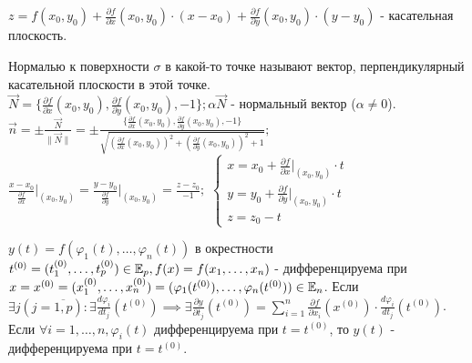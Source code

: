 \documentclass[../main.tex]{subfiles}
\begin{document}
$z = f(x_{0},y_{0}) + \frac{\partial{f}}{\partial{x}}(x_{0},y_{0})\cdot(x-x_{0})+ \frac{\partial{f}}{\partial{y}}(x_{0},y_{0})\cdot(y-y_{0})$ - касательная плоскость. 

Нормалью к поверхности $\sigma$ в какой-то точке называют вектор, перпендикулярный касательной плоскости в этой точке.\\
$\vec{N} = \{ \frac{\partial{f}}{\partial{x}}(x_{0},y_{0}), \frac{\partial{f}}{\partial{y}}(x_{0},y_{0}), -1\} ; \alpha \vec{N}$ - нормальный вектор ($\alpha \neq 0$). 
\\ $\vec{n} = \pm  \frac{\vec{N}}{\|\vec{N}\|} = \pm \frac{\{ \frac{\partial{f}}{\partial{x}}(x_{0},y_{0}), \frac{\partial{f}}{\partial{y}}(x_{0},y_{0}), -1\}}{\sqrt{(\frac{\partial{f}}{\partial{x}}(x_{0},y_{0}))^{2}+(\frac{\partial{f}}{\partial{y}}(x_{0},y_{0}))^{2}+1}};$\qquad $\frac{x-x_{0}}{\frac{\partial{f}}{\partial{x}}}\bigg|_{(x_{0},y_{0})} = \frac{y-y_{0}}{\frac{\partial{f}}{\partial{y}}}\bigg|_{(x_{0},y_{0})} = \frac{z-z_{0}}{-1};$  
$\begin{cases}
    x= x_{0} + \frac{\partial{f}}{\partial{x}}\bigg|_{(x_{0},y_{0})}\cdot t \\
    y= y_{0} + \frac{\partial{f}}{\partial{y}}\bigg|_{(x_{0},y_{0})}\cdot t \\
    z= z_{0} - t
\end{cases}$
\begin{theorem}
$  y(t) = f(\varphi_{1}(t),\dots, \varphi_{n}(t))$ в окрестности $t^{(0)} = (t_{1}^{(0)}, \dots , t_{p}^{(0)}) \in \mathbb{E}_{p}, f(x) = f(x_{1},\dots,x_{n})$ - дифференцируема при $x=x^{(0)} = (x_{1}^{(0)},\dots,x_{n}^{(0)}) = ( \varphi_{1}(t^{(0)}),\dots,\varphi_{n}(t^{(0)}))\in \mathbb{E}_{n}$. Если $\exists j ( j= \overline{1,p}) : \exists \frac{d\varphi_{i}}{dt_{j}}(t^{(0)}) \implies \exists \frac{\partial{y} }{ \partial{t_{j}}}(t^{(0)}) = \sum_{i   =1}^{n  } \frac{\partial{f}}{\partial{x_{i}}}(x^{(0)})\cdot \frac{d\varphi_{i}}{dt_{j}}(t^{(0)})$.\\
Если $\forall i =1,\dots,n , \varphi_{i}(t) $ дифференцируема при $t=t^{(0)}$, то $y(t)$ - дифференцируема при $t=t^{(0)}$.  
\end{theorem}
\end{document}

